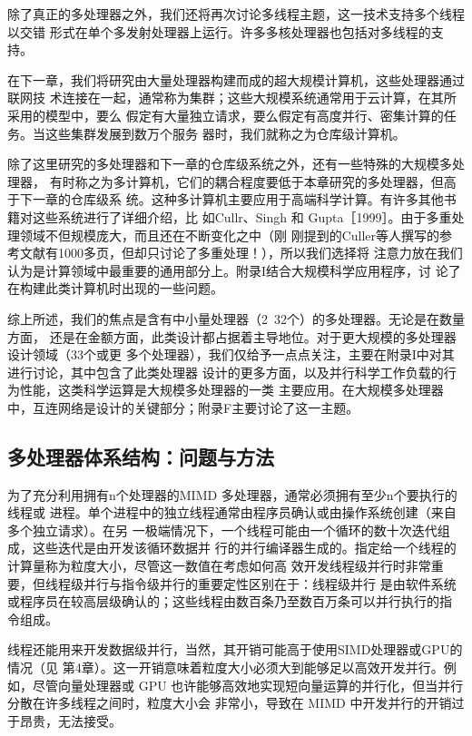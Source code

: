 除了真正的多处理器之外，我们还将再次讨论多线程主题，这一技术支持多个线程以交错
形式在单个多发射处理器上运行。许多多核处理器也包括对多线程的支持。

在下一章，我们将研究由大量处理器构建而成的超大规模计算机，这些处理器通过联网技
术连接在一起，通常称为集群；这些大规模系统通常用于云计算，在其所采用的模型中，要么
假定有大量独立请求，要么假定有高度并行、密集计算的任务。当这些集群发展到数万个服务
器时，我们就称之为仓库级计算机。

除了这里研究的多处理器和下一章的仓库级系统之外，还有一些特殊的大规模多处理器，
有时称之为多计算机，它们的耦合程度要低于本章研究的多处理器，但高于下一章的仓库级系
统。这种多计算机主要应用于高端科学计算。有许多其他书籍对这些系统进行了详细介绍，比
如Cullr、Singh 和 Gupta［1999］。由于多重处理领域不但规模庞大，而且还在不断变化之中（刚
刚提到的Culler等人撰写的参考文献有1000多页，但却只讨论了多重处理！），所以我们选择将
注意力放在我们认为是计算领域中最重要的通用部分上。附录I结合大规模科学应用程序，讨
论了在构建此类计算机时出现的一些问题。

综上所述，我们的焦点是含有中小量处理器（2~32个）的多处理器。无论是在数量方面，
还是在金额方面，此类设计都占据着主导地位。对于更大规模的多处理器设计领域（33个或更
多个处理器），我们仅给予一点点关注，主要在附录I中对其进行讨论，其中包含了此类处理器
设计的更多方面，以及并行科学工作负载的行为性能，这类科学运算是大规模多处理器的一类
主要应用。在大规模多处理器中，互连网络是设计的关键部分；附录F主要讨论了这一主题。

\subsection{多处理器体系结构：问题与方法}
为了充分利用拥有n个处理器的MIMD 多处理器，通常必须拥有至少n个要执行的线程或
进程。单个进程中的独立线程通常由程序员确认或由操作系统创建（来自多个独立请求）。在另
一极端情况下，一个线程可能由一个循环的数十次迭代组成，这些迭代是由开发该循环数据并
行的并行编译器生成的。指定给一个线程的计算量称为粒度大小，尽管这一数值在考虑如何高
效开发线程级并行时非常重要，但线程级并行与指令级并行的重要定性区别在于：线程级并行
是由软件系统或程序员在较高层级确认的；这些线程由数百条乃至数百万条可以并行执行的指
令组成。

线程还能用来开发数据级并行，当然，其开销可能高于使用SIMD处理器或GPU的情况（见
第4章）。这一开销意味着粒度大小必须大到能够足以高效开发并行。例如，尽管向量处理器或
GPU 也许能够高效地实现短向量运算的并行化，但当并行分散在许多线程之间时，粒度大小会
非常小，导致在 MIMD 中开发并行的开销过于昂贵，无法接受。

